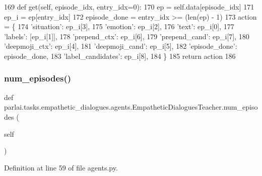 \begin{DoxyCode}
169     \textcolor{keyword}{def }get(self, episode\_idx, entry\_idx=0):
170         ep = self.data[episode\_idx]
171         ep\_i = ep[entry\_idx]
172         episode\_done = entry\_idx >= (len(ep) - 1)
173         action = \{
174             \textcolor{stringliteral}{'situation'}: ep\_i[3],
175             \textcolor{stringliteral}{'emotion'}: ep\_i[2],
176             \textcolor{stringliteral}{'text'}: ep\_i[0],
177             \textcolor{stringliteral}{'labels'}: [ep\_i[1]],
178             \textcolor{stringliteral}{'prepend\_ctx'}: ep\_i[6],
179             \textcolor{stringliteral}{'prepend\_cand'}: ep\_i[7],
180             \textcolor{stringliteral}{'deepmoji\_ctx'}: ep\_i[4],
181             \textcolor{stringliteral}{'deepmoji\_cand'}: ep\_i[5],
182             \textcolor{stringliteral}{'episode\_done'}: episode\_done,
183             \textcolor{stringliteral}{'label\_candidates'}: ep\_i[8],
184         \}
185         \textcolor{keywordflow}{return} action
186 
\end{DoxyCode}
\mbox{\label{classparlai_1_1tasks_1_1empathetic__dialogues_1_1agents_1_1EmpatheticDialoguesTeacher_a89cbd2e9bc8e6d0b4674d91ca2e3440c}} 
\subsubsection{\texorpdfstring{num\+\_\+episodes()}{num\_episodes()}}
{\footnotesize\ttfamily def parlai.\+tasks.\+empathetic\+\_\+dialogues.\+agents.\+Empathetic\+Dialogues\+Teacher.\+num\+\_\+episodes (\begin{DoxyParamCaption}\item[{}]{self }\end{DoxyParamCaption})}



Definition at line 59 of file agents.\+py.



